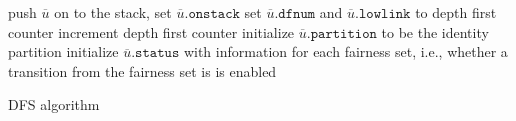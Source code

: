 \documentclass{article}[10pt]
\begin{document}
\begin{spacing}{1}
\begin{algorithm}
\IncMargin{1em}
\SetAlgoLined
push $\overline{u}$ on to the stack, set $\overline{u}.\mathtt{onstack}$\;
set $\overline{u}.\mathtt{dfnum}$ and $\overline{u}.\mathtt{lowlink}$ to
depth first counter\;
increment depth first counter\;
\BlankLine
initialize $\overline{u}.\mathtt{partition}$ to be the identity partition\;
initialize $\overline{u}.\mathtt{status}$ with information for each
fairness set, i.e., whether a transition from the fairness set is is enabled \;

\caption{DFS algorithm}
\DecMargin{1em}
\end{algorithm}

\end{spacing}
\end{document}
